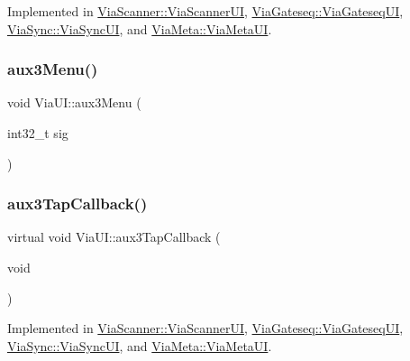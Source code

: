 Implemented in \mbox{\hyperlink{class_via_scanner_1_1_via_scanner_u_i_ac79b09eb94d39065b6b5061d34746862}{Via\+Scanner\+::\+Via\+Scanner\+UI}}, \mbox{\hyperlink{class_via_gateseq_1_1_via_gateseq_u_i_a5b18aa40706a39ed8878143d6911bc78}{Via\+Gateseq\+::\+Via\+Gateseq\+UI}}, \mbox{\hyperlink{class_via_sync_1_1_via_sync_u_i_ae35a16d1e3a6158ffd306b06e93b16a4}{Via\+Sync\+::\+Via\+Sync\+UI}}, and \mbox{\hyperlink{class_via_meta_1_1_via_meta_u_i_ad15168253fc76c7a938ca467ada12ade}{Via\+Meta\+::\+Via\+Meta\+UI}}.

\mbox{\label{class_via_u_i_adf0e11621a20477354eb1169c3943cb8}} 
\subsubsection{\texorpdfstring{aux3\+Menu()}{aux3Menu()}}
{\footnotesize\ttfamily void Via\+U\+I\+::aux3\+Menu (\begin{DoxyParamCaption}\item[{int32\+\_\+t}]{sig }\end{DoxyParamCaption})}

\mbox{\label{class_via_u_i_a29026efd361a615374adce2462aa652a}} 
\subsubsection{\texorpdfstring{aux3\+Tap\+Callback()}{aux3TapCallback()}}
{\footnotesize\ttfamily virtual void Via\+U\+I\+::aux3\+Tap\+Callback (\begin{DoxyParamCaption}\item[{void}]{ }\end{DoxyParamCaption})\hspace{0.3cm}{\ttfamily [pure virtual]}}



Implemented in \mbox{\hyperlink{class_via_scanner_1_1_via_scanner_u_i_a7d15083a3565f56b4b70ac497fddd563}{Via\+Scanner\+::\+Via\+Scanner\+UI}}, \mbox{\hyperlink{class_via_gateseq_1_1_via_gateseq_u_i_a9bb95780740cd9fe650ba38aa3fb86a6}{Via\+Gateseq\+::\+Via\+Gateseq\+UI}}, \mbox{\hyperlink{class_via_sync_1_1_via_sync_u_i_afe95d77f17525a7e612485089a01ab0d}{Via\+Sync\+::\+Via\+Sync\+UI}}, and \mbox{\hyperlink{class_via_meta_1_1_via_meta_u_i_a4f9a282e24dd484d24657a1568defd75}{Via\+Meta\+::\+Via\+Meta\+UI}}.

